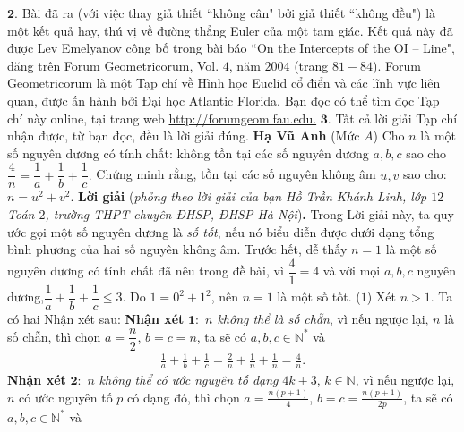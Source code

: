 \begin{multicols}{2}
	\vskip 0.05cm
	$\pmb{2.}$ Bài đã ra (với việc thay giả thiết ``không cân" bởi giả thiết ``không đều") là một kết quả hay, thú vị về đường thẳng Euler của một tam giác. Kết quả này đã được Lev Emelyanov công bố trong bài báo ``On the Intercepts of the OI -- Line", đăng trên Forum Geometricorum, Vol. $4$, năm $2004$ (trang $81 - 84$).
	Forum Geometricorum là một Tạp chí về Hình học Euclid cổ điển và các lĩnh vực liên quan, được ấn hành bởi Đại học Atlantic Florida. Bạn đọc có thể tìm đọc Tạp chí này online, tại trang web \url{http://forumgeom.fau.edu.}
	\vskip 0.05cm
	$\pmb{3.}$ Tất cả lời giải Tạp chí nhận được, từ bạn đọc, đều là lời giải đúng.
	\vskip 0.05cm
	\hfill	\textbf{\color{thachthuctoanhoc}Hạ Vũ Anh}
	\vskip 0.05cm
	{}
	(Mức $A$) Cho $n$ là một số nguyên dương có tính chất: không tồn tại các số nguyên dương $a,b,c$ sao cho $\dfrac4n=\dfrac 1a+\dfrac 1b+\dfrac 1c.$ Chứng minh rằng, tồn tại các số nguyên không âm $u,v$ sao cho: $n=u^2+v^2$.  
	\vskip 0.05cm
	\textbf{\color{thachthuctoanhoc}Lời giải} (\textit{phỏng theo lời giải của bạn Hồ Trần Khánh Linh, lớp $12$ Toán $2$, trường THPT chuyên ĐHSP, ĐHSP Hà Nội})\textbf{\color{thachthuctoanhoc}.}
	\vskip 0.05cm
	Trong Lời giải này, ta quy ước gọi một số nguyên dương là \textit{số tốt}, nếu nó biểu diễn được dưới dạng tổng bình phương của hai số nguyên không âm.
	\vskip 0.05cm
	Trước hết, dễ thấy $n = 1$ là một số nguyên dương có tính chất đã nêu trong đề bài, vì $\dfrac{4}{1} = 4$ và với mọi $a, b, c$ nguyên dương,\linebreak $\dfrac{1}{a} + \dfrac{1}{b} + \dfrac{1}{c} \le 3$.
	\vskip 0.05cm
	Do  $1 = 0^2 + 1^2$, nên $n = 1$ là một số tốt. \hfill ($1$)
	\vskip 0.05cm
	Xét $n > 1$.
	\vskip 0.05cm
	Ta có hai Nhận xét sau:
	\vskip 0.05cm
	\textbf{\color{thachthuctoanhoc}Nhận xét} $\pmb{1:}$ \textit{$n$ không thể là số chẵn}, vì nếu ngược lại, $n$ là số chẵn, thì chọn  $a= \dfrac{n}{2}$, \linebreak$b = c = n$, ta sẽ có $a,b,c \in \mathbb{N^*}$  và
	\begin{align*}
		\frac{1}{a} + \frac{1}{b} + \frac{1}{c} 
		= \frac{2}{n} + \frac{1}{n} + \frac{1}{n} = \frac{4}{n}.
	\end{align*}
	\textbf{\color{thachthuctoanhoc}Nhận xét} $\pmb{2:}$ $n$ \textit{không thể có ước nguyên tố dạng} $4k + 3$, $k \in \mathbb{N}$, vì nếu ngược lại, $n$ có ước nguyên tố $p$ có dạng đó, thì chọn  $a = \frac{{n\left( {p + 1} \right)}}{4}$,  $b = c = \frac{{n\left( {p + 1} \right)}}{{2p}}$, ta sẽ có $a,b,c \in \mathbb{N^*}$  và

\end{multicols}
